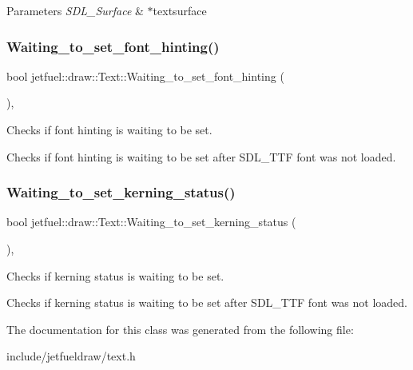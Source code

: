 \begin{DoxyParams}{Parameters}
{\em S\+D\+L\+\_\+\+Surface} & $\ast$textsurface \\
\hline
\end{DoxyParams}
\mbox{\label{classjetfuel_1_1draw_1_1Text_a33158c6a5dfedf26cb0526388c347e93}} 
\subsubsection{\texorpdfstring{Waiting\+\_\+to\+\_\+set\+\_\+font\+\_\+hinting()}{Waiting\_to\_set\_font\_hinting()}}
{\footnotesize\ttfamily bool jetfuel\+::draw\+::\+Text\+::\+Waiting\+\_\+to\+\_\+set\+\_\+font\+\_\+hinting (\begin{DoxyParamCaption}{ }\end{DoxyParamCaption})\hspace{0.3cm}{\ttfamily [inline]}, {\ttfamily [protected]}}



Checks if font hinting is waiting to be set. 

Checks if font hinting is waiting to be set after S\+D\+L\+\_\+\+T\+TF font was not loaded. \mbox{\label{classjetfuel_1_1draw_1_1Text_ac3037b299f5e398da3c1bf52fdfa3d00}} 
\subsubsection{\texorpdfstring{Waiting\+\_\+to\+\_\+set\+\_\+kerning\+\_\+status()}{Waiting\_to\_set\_kerning\_status()}}
{\footnotesize\ttfamily bool jetfuel\+::draw\+::\+Text\+::\+Waiting\+\_\+to\+\_\+set\+\_\+kerning\+\_\+status (\begin{DoxyParamCaption}{ }\end{DoxyParamCaption})\hspace{0.3cm}{\ttfamily [inline]}, {\ttfamily [protected]}}



Checks if kerning status is waiting to be set. 

Checks if kerning status is waiting to be set after S\+D\+L\+\_\+\+T\+TF font was not loaded. 

The documentation for this class was generated from the following file\+:\begin{DoxyCompactItemize}
\item 
include/jetfueldraw/text.\+h\end{DoxyCompactItemize}
